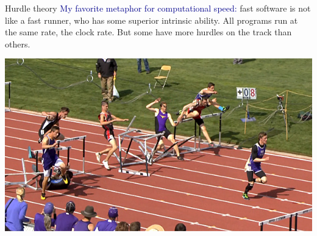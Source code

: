 \documentclass{beamer}
\begin{document}
\begin{frame}{Hurdle theory}
\vspace{0.5 cm}
\textcolor{darkblue}{My favorite metaphor for computational speed:} fast software is not like a fast runner, who has some superior intrinsic ability. All programs run at the same rate, the clock rate. But some have more hurdles on the track than others.

\vspace{0.25 cm}
\begin{center}
\includegraphics[width=0.7\linewidth]{hurdle9.jpg}
\end{center}
\end{frame}
\end{document}
